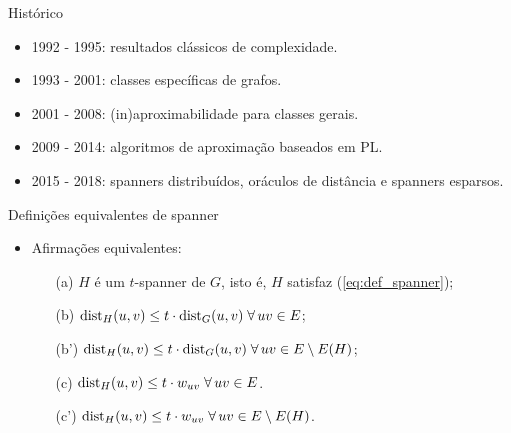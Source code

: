 \documentclass[dvipsnames]{beamer}
\newcommand{\dist}{{\rm dist}}
\begin{document}
\appendix

\begin{frame}{Histórico \hyperlink{hist}{\beamergotobutton{$\leftarrow$}}}
  \hypertarget{histmaior}{}
  \begin{itemize}    
  \item <1-> 1992 - 1995: resultados clássicos de complexidade.
  \item <2-> 1993 - 2001: classes específicas de grafos.
  \item <3-> 2001 - 2008: (in)aproximabilidade para classes gerais.
  \item <4-> 2009 - 2014: algoritmos de aproximação baseados em PL.
  \item <5-> 2015 - 2018: spanners distribuídos, oráculos de distância e
    spanners esparsos.    
  \end{itemize}
\end{frame}


\begin{frame}{Definições equivalentes de spanner \hyperlink{span}{\beamergotobutton{$\leftarrow$}}}
  \hypertarget{defspan}{}
  \begin{itemize}
    \item Afirmações equivalentes:
      \begin{itemize}
        \item[{\rm (a)}] $H$ é um $t$-spanner de $G$, isto é, $H$ satisfaz (\ref{eq:def_spanner});
        \item[{\rm (b)}] $\dist_{H}(u,v) \le t \cdot \dist_{G}(u,v) \;\forall\,uv \in E$;
        \item[{\rm (b')}] $\dist_{H}(u,v) \le t \cdot \dist_{G}(u,v) \;\forall\,uv \in E \setminus E(H)$;
        \item[{\rm (c)}] $\dist_{H}(u,v) \le t \cdot w_{uv} \;\forall\,uv \in E$.
        \item[{\rm (c')}] $\dist_{H}(u,v) \le t \cdot w_{uv} \;\forall\,uv \in E \setminus E(H)$.
        \end{itemize}
    \end{itemize}
\end{frame}
\end{document}
